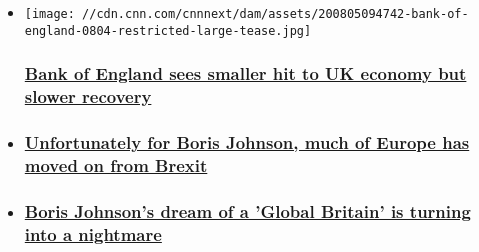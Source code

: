 \begin{itemize}
\item
  \href{/2020/08/06/economy/bank-of-england-uk-economy/index.html}{}

  \texttt{[image: //cdn.cnn.com/cnnnext/dam/assets/200805094742-bank-of-england-0804-restricted-large-tease.jpg]}

  \hypertarget{bank-of-england-sees-smaller-hit-to-uk-economy-but-slower-recovery-2}{%
  \subsubsection{\texorpdfstring{\href{/2020/08/06/economy/bank-of-england-uk-economy/index.html}{Bank
  of England sees smaller hit to UK economy but slower
  recovery}}{Bank of England sees smaller hit to UK economy but slower recovery}}\label{bank-of-england-sees-smaller-hit-to-uk-economy-but-slower-recovery-2}}
\item
  \hypertarget{unfortunately-for-boris-johnson-much-of-europe-has-moved-on-from-brexit-1}{%
  \subsubsection{\texorpdfstring{\href{/2020/07/29/uk/eu-brexit-intl-gbr/index.html}{Unfortunately
  for Boris Johnson, much of Europe has moved on from
  Brexit}}{Unfortunately for Boris Johnson, much of Europe has moved on from Brexit}}\label{unfortunately-for-boris-johnson-much-of-europe-has-moved-on-from-brexit-1}}
\item
  \hypertarget{boris-johnsons-dream-of-a-global-britain-is-turning-into-a-nightmare-1}{%
  \subsubsection{\texorpdfstring{\href{/2020/07/24/business/brexit-trade-deals-boris-johnson/index.html}{Boris
  Johnson's dream of a 'Global Britain' is turning into a
  nightmare}}{Boris Johnson's dream of a 'Global Britain' is turning into a nightmare}}\label{boris-johnsons-dream-of-a-global-britain-is-turning-into-a-nightmare-1}}
\end{itemize}


